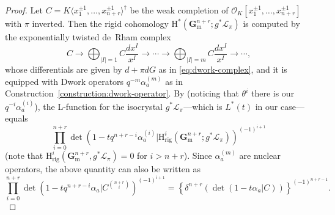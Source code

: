 \documentclass{amsart}
\numberwithin{equation}{section}
\theoremstyle{plain}
\theoremstyle{definition}
\renewcommand{\mathbb}{\mathbf}
\begin{document}
\begin{proof}
Let \(C = K\langle x^{\pm 1}_{1},\ldots,x_{n+r}^{\pm 1} \rangle^{\dagger}\)
be the weak completion of \(\mathcal{O}_{K}[x_{1}^{\pm 1},\ldots,x_{n+r}^{\pm 1}]\) with \(\pi\) inverted.
Then the rigid cohomology \(\mathrm{H}^{\ast}(\mathbb{G}_{\mathrm{m}}^{n+r};g^{\ast}\mathcal{L}_{\pi})\)
is computed by the exponentially twisted de~Rham complex
\begin{equation*}%
C \to \bigoplus_{|I| = 1} C \frac{dx^{I}}{x^{I}} \to \cdots \to \bigoplus_{|I|=m} C \frac{dx^{I}}{x^{I}} \to \cdots,
\end{equation*}
whose differentials are given by \(d+\pi dG\) as in
\eqref{eq:dwork-complex}, and it is equipped with Dwork operators
\(q^{-m}\alpha_{a}^{(m)}\) as in Construction~\ref{construction:dwork-operator}.  By
\cite[Théorème~6.3II]{etesse-le-stum:l-functions-associated-to-overconvergent-f-isocrystals-1}
(noticing that \(\theta^{i}\) there is our \(q^{-i}\alpha_{a}^{(i)}\)),
the L-function for the isocrystal
\(g^{\ast}\mathcal{L}_{\pi}\)---which is \(L^{\ast}(t)\) in our
case---equals
\[
\prod_{i=0}^{n+r}\det(1 - t q^{n+r-i}\alpha_{a}^{(i)} |
\mathrm{H}^{i}_{\mathrm{rig}}(\mathbb{G}_{\mathrm{m}}^{n+r};g^{\ast}\mathcal{L}_{\pi}))^{(-1)^{i+1}}
\]
(note that \(\mathrm{H}^{i}_{\mathrm{rig}}(\mathbb{G}_{\mathrm{m}}^{n+r},g^{\ast}\mathcal{L}_{\pi})=0\) for \(i > n+r\)).
Since \(\alpha_{a}^{(m)}\) are nuclear operators,
the above quantity can also be written as
\begin{equation}
\label{eq:trace-formula}
\prod_{i=0}^{n+r}\det(1 - tq^{n+r-i}\alpha_{a}| C^{\binom{n+r}{i}})^{(-1)^{i+1}} =
\left\{\delta^{n+r}\left( \det( 1 - t\alpha_{a} | C) \right)\right\}^{(-1)^{n+r-1}}.
\end{equation}


\end{proof}
\end{document}
